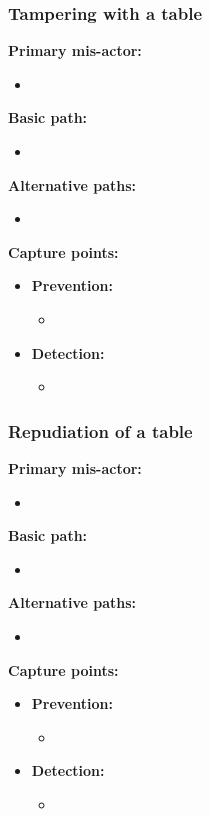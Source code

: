 \documentclass[a4paper,11pt]{report}
\begin{document}
\subsubsection{Tampering with a table}
\textbf{Primary mis-actor:}
\begin{itemize}
\item 
\end{itemize}
\textbf{Basic path:}
\begin{itemize}
\item 
\end{itemize}
\textbf{Alternative paths:}
\begin{itemize}
\item 
\end{itemize}
\textbf{Capture points:}
\begin{itemize}
\item \textbf{Prevention:}
\begin{itemize}
\item 
\end{itemize}
\item \textbf{Detection:}
\begin{itemize}
\item 
\end{itemize}
\end{itemize}
\subsubsection{Repudiation of a table}
\textbf{Primary mis-actor:}
\begin{itemize}
\item 
\end{itemize}
\textbf{Basic path:}
\begin{itemize}
\item 
\end{itemize}
\textbf{Alternative paths:}
\begin{itemize}
\item 
\end{itemize}
\textbf{Capture points:}
\begin{itemize}
\item \textbf{Prevention:}
\begin{itemize}
\item 
\end{itemize}
\item \textbf{Detection:}
\begin{itemize}
\item 
\end{itemize}
\end{itemize}
\end{document}
